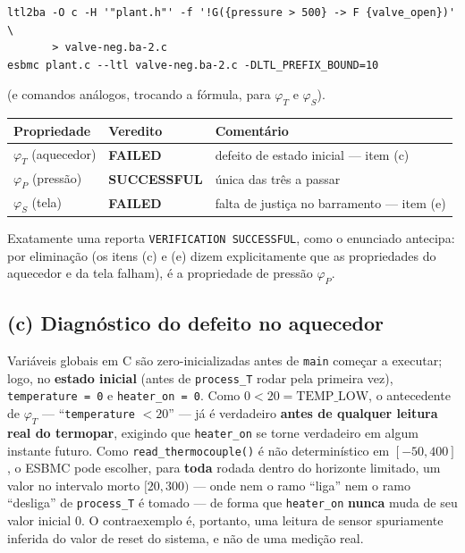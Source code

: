 \documentclass[12pt,a4paper]{article}
\newcommand{\vv}[1]{\texttt{#1}}
\begin{document}
\begin{lstlisting}[style=shstyle]
ltl2ba -O c -H '"plant.h"' -f '!G({pressure > 500} -> F {valve_open})' \
       > valve-neg.ba-2.c
esbmc plant.c --ltl valve-neg.ba-2.c -DLTL_PREFIX_BOUND=10
\end{lstlisting}
(e comandos an\'alogos, trocando a f\'ormula, para $\varphi_T$ e $\varphi_S$).

\begin{tcolorbox}[resultbox]
\begin{center}
\begin{tabular}{@{}lll@{}}
\toprule
Propriedade & Veredito & Coment\'ario \\
\midrule
$\varphi_T$ (aquecedor) & \textbf{FAILED} & defeito de estado inicial --- item (c) \\
$\varphi_P$ (press\~ao) & \textbf{SUCCESSFUL} & \'unica das tr\^es a passar \\
$\varphi_S$ (tela) & \textbf{FAILED} & falta de justi\c{c}a no barramento --- item (e) \\
\bottomrule
\end{tabular}
\end{center}
Exatamente uma reporta \texttt{VERIFICATION SUCCESSFUL}, como o enunciado antecipa: por
elimina\c{c}\~ao (os itens (c) e (e) dizem explicitamente que as propriedades do aquecedor
e da tela falham), \'e a propriedade de press\~ao $\varphi_P$.
\end{tcolorbox}

\subsection{(c) Diagn\'ostico do defeito no aquecedor}

Vari\'aveis globais em C s\~ao zero-inicializadas antes de \vv{main} come\c{c}ar a
executar; logo, no \textbf{estado inicial} (antes de \vv{process\_T} rodar pela primeira
vez), \vv{temperature = 0} e \vv{heater\_on = 0}. Como $0 < 20 = \mathrm{TEMP\_LOW}$, o
antecedente de $\varphi_T$ --- ``\vv{temperature} $<20$'' --- j\'a \'e verdadeiro
\textbf{antes de qualquer leitura real do termopar}, exigindo que \vv{heater\_on} se torne
verdadeiro em algum instante futuro. Como \vv{read\_thermocouple()} \'e n\~ao
determin\'istico em $[-50,400]$, o ESBMC pode escolher, para \textbf{toda} rodada dentro
do horizonte limitado, um valor no intervalo morto $[20,300)$ --- onde nem o ramo ``liga''
nem o ramo ``desliga'' de \vv{process\_T} \'e tomado --- de forma que \vv{heater\_on}
\textbf{nunca} muda de seu valor inicial 0. O contraexemplo \'e, portanto, uma leitura de
sensor spuriamente inferida do valor de reset do sistema, e n\~ao de uma medi\c{c}\~ao
real.
\end{document}
